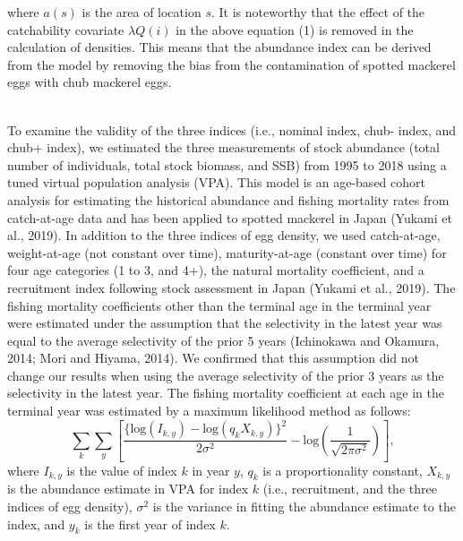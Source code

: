 \documentclass[12pt]{article}
\begin{document}
\begin{linenumbers}
{%
where $a (s)$ is the area of location $s$. It is noteworthy that  the effect of the catchability covariate $\lambda Q(i)$ in the above equation (1) is removed in the calculation of densities. This means that the abundance index can be derived from the model by removing the bias from the contamination of spotted mackerel eggs with chub mackerel eggs.

\\
To examine the validity of the three indices (i.e., nominal index, chub- index, and chub+ index), we estimated the three measurements of stock abundance (total number of individuals, total stock biomass, and SSB) from 1995 to 2018 using a tuned virtual population analysis (VPA). This model is an age-based cohort analysis for estimating the historical abundance and fishing mortality rates from catch-at-age data and has been applied to spotted mackerel in Japan (Yukami et al., 2019). In addition to the three indices of egg density, we used catch-at-age, weight-at-age (not constant over time), maturity-at-age (constant over time) for four age categories (1 to 3, and 4+), the natural mortality coefficient, and a recruitment index following stock assessment in Japan (Yukami et al., 2019). The fishing mortality coefficients other than the terminal age in the terminal year were estimated under the assumption that the selectivity in the latest year was equal to the average selectivity of the prior 5 years (Ichinokawa and Okamura, 2014; Mori and Hiyama, 2014). We confirmed that this assumption did not change our results when using the average selectivity of the prior 3 years as the selectivity in the latest year. The fishing mortality coefficient at each age in the terminal year was estimated by a maximum likelihood method as follows:
\[\sum_{k} \sum_{y} \left[ \frac{\{\mathrm{log}(I_{k,y})-\mathrm{log}(q_{k}X_{k,y})\}^2} {2\sigma^{2}} - \mathrm{log}(\frac{1} {\sqrt{2\pi\sigma^{2}}}) \right]
,\]
where $I_{k,y}$ is the value of index $k$ in year $y$, $q_{k}$ is a proportionality constant, $X_{k,y}$ is the abundance estimate in VPA for index $k$ (i.e., recruitment, and the three indices of egg density), $\sigma^2$ is the variance in fitting the abundance estimate to the index, and $y_{k}$ is the first year of index $k$.

}
\end{linenumbers}
\end{document}

